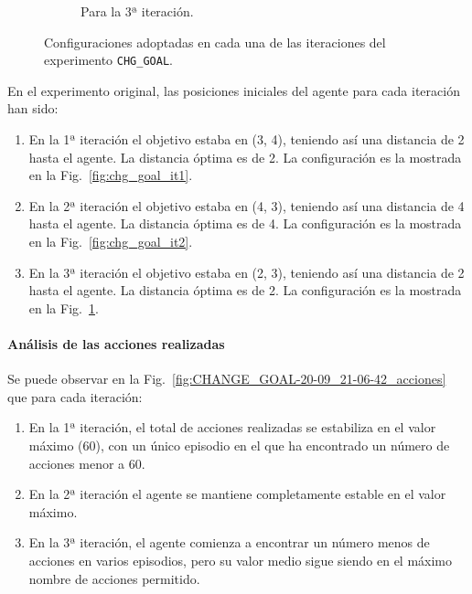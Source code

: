 \begin{figure}
\begin{subfigure}{.35\textwidth}
        \caption{Para la 3ª iteración.}
        \label{fig:chg_goal_it3}
    \end{subfigure}%
    \caption{Configuraciones adoptadas en cada una de las iteraciones del experimento \texttt{CHG\_GOAL}.}
    \label{fig:chg_goal_config}
\end{figure}

En el experimento original, las posiciones iniciales del agente para cada iteración han sido: 

\begin{enumerate}
    \item En la 1ª iteración el objetivo estaba en (3, 4), teniendo así una distancia de 2 hasta el agente. La distancia óptima es de 2. La configuración es la mostrada en la Fig.~\ref{fig:chg_goal_it1}.
    \item En la 2ª iteración el objetivo estaba en (4, 3), teniendo así una distancia de 4 hasta el agente. La distancia óptima es de 4.  La configuración es la mostrada en la Fig.~\ref{fig:chg_goal_it2}.
    \item En la 3ª iteración el objetivo estaba en (2, 3), teniendo así una distancia de 2 hasta el agente. La distancia óptima es de 2.  La configuración es la mostrada en la Fig.~\ref{fig:chg_goal_it3}.
\end{enumerate}

\paragraph{Análisis de las acciones realizadas}

Se puede observar en la Fig.~\ref{fig:CHANGE_GOAL-20-09_21-06-42_acciones} que para cada iteración: 
\begin{enumerate}
    \item En la 1ª iteración, el total de acciones realizadas se estabiliza en el valor máximo (60), con un único episodio en el que ha encontrado un número de acciones menor a 60. 
    \item En la 2ª iteración el agente se mantiene completamente estable en el valor máximo.  
    \item En la 3ª iteración, el agente comienza a encontrar un número menos de acciones en varios episodios, pero su valor medio sigue siendo en el máximo nombre de acciones permitido. 
\end{enumerate}

